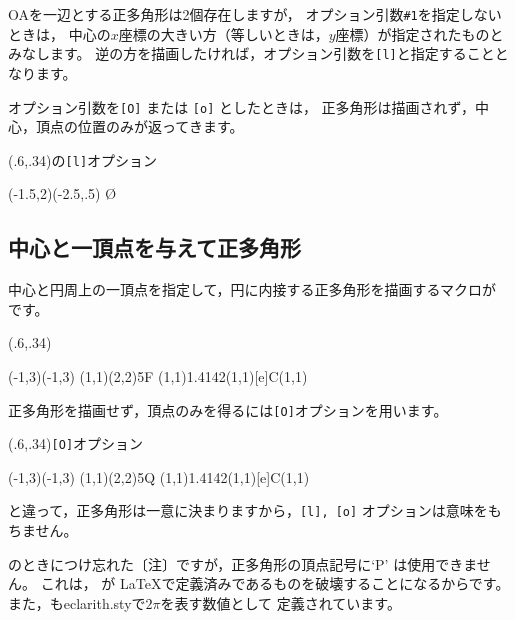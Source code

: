 \documentclass[a4j]{jarticle}
\begin{document}
OAを一辺とする正多角形は2個存在しますが，
オプション引数\verb+#1+を指定しないときは，
中心の$x$座標の大きい方（等しいときは，$y$座標）が指定されたものとみなします。
逆の方を描画したければ，オプション引数を\verb+[l]+と指定することとなります。

オプション引数を\verb+[O]+ または \verb+[o]+ としたときは，
正多角形は描画されず，中心，頂点の位置のみが返ってきます。

\begin{showEx}(.6,.34){の\texttt{[l]}オプション}
\begin{zahyou}[ul=10mm](-1.5,2)(-2.5,.5)
  \Rpolygon[l]\O{}
\end{zahyou}
\end{showEx}


\subsection{中心と一頂点を与えて正多角形}

中心と円周上の一頂点を指定して，円に内接する正多角形を描画するマクロが
です。

\begin{showEx}(.6,.34){}
\footnotesize
\begin{zahyou}(-1,3)(-1,3)
\def\C{(1,1)}
\def\A{(2,2)}
\CRpolygon\C\A{5}{F}
\En\C{1.4142}\Put\C[e]{C}\Kuromaru\C
\Put{}\Kuromaru\Fi
\Put{}\Kuromaru\Fii
\Put{}\Kuromaru\Fiii
\Put{}\Kuromaru\Fiv
\Put{}\Kuromaru\Fv
\end{zahyou}
\end{showEx}

正多角形を描画せず，頂点のみを得るには\texttt{[O]}オプションを用います。

\begin{showEx}(.6,.34){\texttt{[O]}オプション}
\footnotesize
\begin{zahyou}(-1,3)(-1,3)
\def\C{(1,1)}
\def\A{(2,2)}
\CRpolygon[O]\C\A{5}{Q}
\En\C{1.4142}\Put\C[e]{C}\Kuromaru\C
\Put{}\Kuromaru\Qi
\Put{}\Kuromaru\Qii
\Put{}\Kuromaru\Qiii
\Put{}\Kuromaru\Qiv
\Put{}\Kuromaru\Qv
\end{zahyou}
\end{showEx}

と違って，正多角形は一意に決まりますから，\texttt{[l], [o]}
オプションは意味をもちません。

のときにつけ忘れた〔注〕ですが，正多角形の頂点記号に`P'
は使用できません。
これは， が \LaTeX で定義済みであるものを破壊することになるからです。
また，も\textsf{eclarith.sty}で$2\pi$を表す数値として
定義されています。
\end{document}
